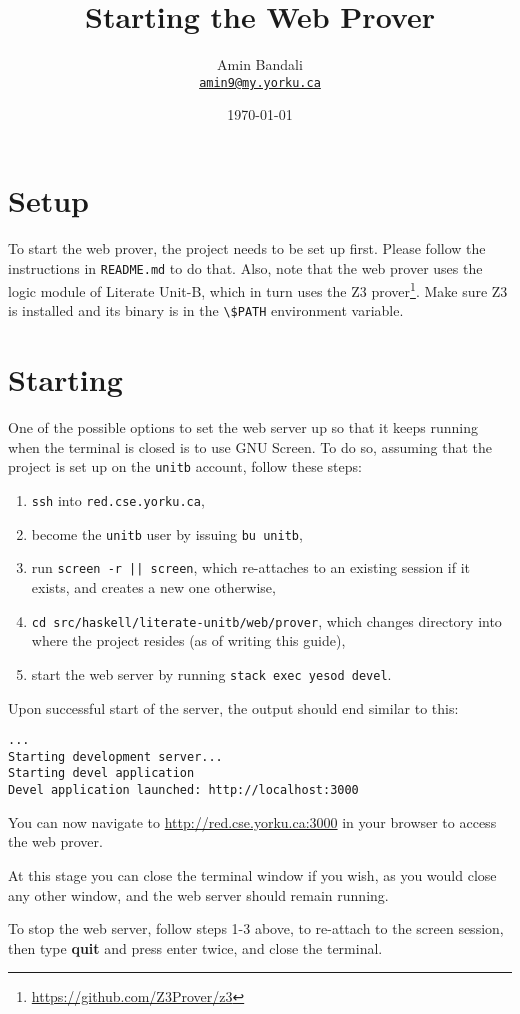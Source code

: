 \documentclass{article}
\title{Starting the Web Prover}
\author{
  Amin Bandali
  \\
  \href{mailto:amin9@cse.yorku.ca}
  {\normalsize\texttt{amin9@my.yorku.ca}}
}
\date{\today}
\newcommand{\code}[1]
{\colorbox{code-bg}{\lstinline[style=inline]!#1!}}
\begin{document}
\setlength{\droptitle}{-2cm}

\maketitle

\section{Setup}

To start the web prover, the project needs to be set up first. Please follow the
instructions in \verb#README.md# to do that. Also, note that the web prover
uses the logic module of Literate Unit-B, which in turn uses the Z3
prover\footnote{\url{https://github.com/Z3Prover/z3}}. Make
sure Z3 is installed and its binary is in the \code{\$PATH} environment variable.

\section{Starting}

One of the possible options to set the web server up so that it keeps running
when the terminal is closed is to use GNU Screen. To do so, assuming that the
project is set up on the \verb#unitb# account, follow these steps:

\begin{enumerate}
\item \verb#ssh# into \code{red.cse.yorku.ca},

\item become the \verb#unitb# user by issuing \code{bu unitb},

\item run \code{screen -r || screen}, which re-attaches to an existing session
  if it exists, and creates a new one otherwise,

\item \code{cd src/haskell/literate-unitb/web/prover}, which changes directory
  into where the project resides (as of writing this guide),

\item start the web server by running \code{stack exec yesod devel}.
\end{enumerate}

Upon successful start of the server, the output should end similar to this:

\begin{verbatim}
...
Starting development server...
Starting devel application
Devel application launched: http://localhost:3000
\end{verbatim}

You can now navigate to \url{http://red.cse.yorku.ca:3000} in your browser to
access the web prover.\newline

At this stage you can close the terminal window if you wish, as you would close
any other window, and the web server should remain running.\newline

To stop the web server, follow steps 1-3 above, to re-attach to the screen
session, then type \textbf{quit} and press enter twice, and close the terminal.
\end{document}

